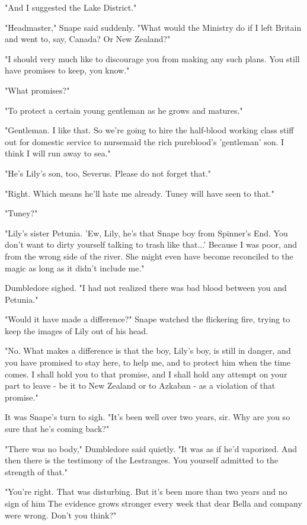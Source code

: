 \documentclass[a4paper,11pt]{article}
\begin{document}
"And I suggested the Lake District."

"Headmaster," Snape said suddenly. "What would the Ministry do if I left Britain and went to, say, Canada? Or New Zealand?"

"I should very much like to discourage you from making any such plans. You still have promises to keep, you know."

"What promises?"

"To protect a certain young gentleman as he grows and matures."

"Gentleman. I like that. So we're going to hire the half-blood working class stiff out for domestic service to nursemaid the rich pureblood's 'gentleman' son. I think I will run away to sea."

"He's Lily's son, too, Severus. Please do not forget that."

"Right. Which means he'll hate me already. Tuney will have seen to that."

"Tuney?"

"Lily's sister Petunia. 'Ew, Lily, he's that Snape boy from Spinner's End. You don't want to dirty yourself talking to trash like that...' Because I was poor, and from the wrong side of the river. She might even have become reconciled to the magic as long as it didn't include me."

Dumbledore sighed. "I had not realized there was bad blood between you and Petunia."

"Would it have made a difference?" Snape watched the flickering fire, trying to keep the images of Lily out of his head.

"No. What makes a difference is that the boy, Lily's boy, is still in danger, and you have promised to stay here, to help me, and to protect him when the time comes. I shall hold you to that promise, and I shall hold any attempt on your part to leave - be it to New Zealand or to Azkaban - as a violation of that promise."

It was Snape's turn to sigh. "It's been well over two years, sir. Why are you so sure that he's coming back?"

"There was no body," Dumbledore said quietly. "It was as if he'd vaporized. And then there is the testimony of the Lestranges. You yourself admitted to the strength of that."

"You're right. That was disturbing. But it's been more than two years and no sign of him The evidence grows stronger every week that dear Bella and company were wrong. Don't you think?"
\end{document}
